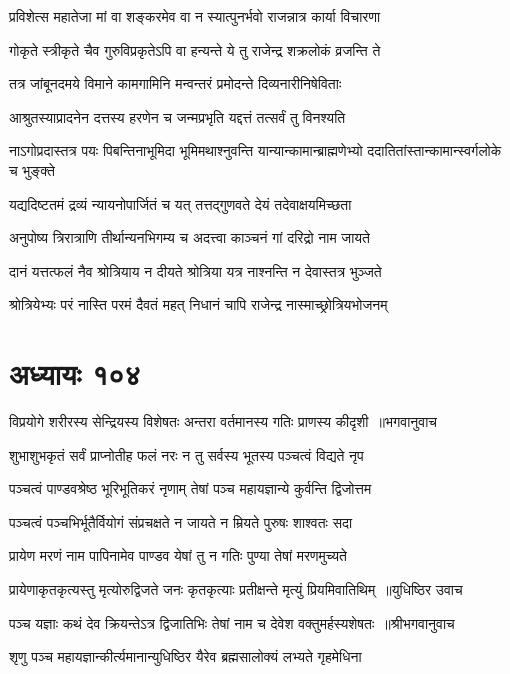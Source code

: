 \twolineshloka
{प्रविशेत्स महातेजा मां वा शङ्करमेव वा}
{न स्यात्पुनर्भवो राजन्नात्र कार्या विचारणा}


\twolineshloka
{गोकृते स्त्रीकृते चैव गुरुविप्रकृतेऽपि वा}
{हन्यन्ते ये तु राजेन्द्र शक्रलोकं व्रजन्ति ते}


\twolineshloka
{तत्र जांबूनदमये विमाने कामगामिनि}
{मन्वन्तरं प्रमोदन्ते दिव्यनारीनिषेविताः}


\twolineshloka
{आश्रुतस्याप्रादनेन दत्तस्य हरणेन च}
{जन्मप्रभृति यद्दत्तं तत्सर्वं तु विनश्यति}


\twolineshloka
{नाऽगोप्रदास्तत्र पयः पिबन्तिनाभूमिदा भूमिमथाश्नुवन्ति}
{यान्यान्कामान्ब्राह्मणेभ्यो ददातितांस्तान्कामान्स्वर्गलोके च भुङ्क्ते}


\twolineshloka
{यद्यदिष्टतमं द्रव्यं न्यायनोपार्जितं च यत्}
{तत्तद्गुणवते देयं तदेवाक्षयमिच्छता}


\twolineshloka
{अनुपोष्य त्रिरात्राणि तीर्थान्यनभिगम्य च}
{अदत्त्वा काञ्चनं गां दरिद्रो नाम जायते}


\twolineshloka
{दानं यत्तत्फलं नैव श्रोत्रियाय न दीयते}
{श्रोत्रिया यत्र नाश्नन्ति न देवास्तत्र भुञ्जते}


\twolineshloka
{श्रोत्रियेभ्यः परं नास्ति परमं दैवतं महत्}
{निधानं चापि राजेन्द्र नास्माच्छ्रोत्रियभोजनम्}


\chapter{अध्यायः १०४}
\threelineshloka
{विप्रयोगे शरीरस्य सेन्द्रियस्य विशेषतः}
{अन्तरा वर्तमानस्य गतिः प्राणस्य कीदृशी ॥भगवानुवाच}
{}


\twolineshloka
{शुभाशुभकृतं सर्वं प्राप्नोतीह फलं नरः}
{न तु सर्वस्य भूतस्य पञ्चत्वं विद्यते नृप}


\twolineshloka
{पञ्चत्वं पाण्डवश्रेष्ठ भूरिभूतिकरं नृणाम्}
{तेषां पञ्च महायज्ञान्ये कुर्वन्ति द्विजोत्तम}


\twolineshloka
{पञ्चत्वं पञ्चभिर्भूतैर्वियोगं संप्रचक्षते}
{न जायते न म्रियते पुरुषः शाश्वतः सदा}


\twolineshloka
{प्रायेण मरणं नाम पापिनामेव पाण्डव}
{येषां तु न गतिः पुण्या तेषां मरणमुच्यते}


\threelineshloka
{प्रायेणाकृतकृत्यस्तु मृत्योरुद्विजते जनः}
{कृतकृत्याः प्रतीक्षन्ते मृत्युं प्रियमिवातिथिम् ॥युधिष्ठिर उवाच}
{}


\threelineshloka
{पञ्च यज्ञाः कथं देव क्रियन्तेऽत्र द्विजातिभिः}
{तेषां नाम च देवेश वक्तुमर्हस्यशेषतः ॥श्रीभगवानुवाच}
{}


\twolineshloka
{शृणु पञ्च महायज्ञान्कीर्त्यमानान्युधिष्ठिर}
{यैरेव ब्रह्मसालोक्यं लभ्यते गृहमेधिना}



